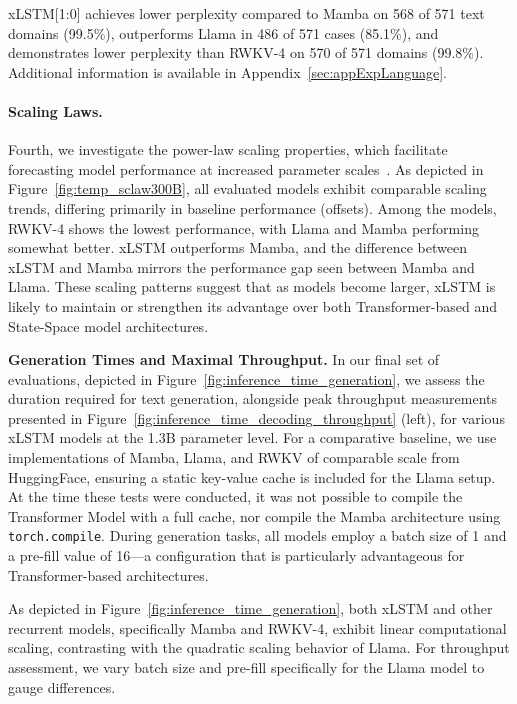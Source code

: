 xLSTM[1:0] achieves lower perplexity compared to Mamba on 568 of 571 text domains (99.5\%), outperforms Llama in 486 of 571 cases (85.1\%), and demonstrates lower perplexity than RWKV-4 on 570 of 571 domains (99.8\%). Additional information is available in Appendix~\ref{sec:appExpLanguage}.

\paragraph{Scaling Laws.} Fourth, we investigate the power-law scaling properties, which facilitate forecasting model performance at increased parameter scales~\citep{Kaplan:20,Brown:20short}. 
As depicted in Figure~\ref{fig:temp_sclaw300B}, all evaluated models exhibit comparable scaling trends, differing primarily in baseline performance (offsets). Among the models, RWKV-4 shows the lowest performance, with Llama and Mamba performing somewhat better. xLSTM outperforms Mamba, and the difference between xLSTM and Mamba mirrors the performance gap seen between Mamba and Llama. These scaling patterns suggest that as models become larger, xLSTM is likely to maintain or strengthen its advantage over both Transformer-based and State-Space model architectures.

\textbf{Generation Times and Maximal Throughput.} In our final set of evaluations, depicted in Figure~\ref{fig:inference_time_generation}, we assess the duration required for text generation, alongside peak throughput measurements presented in Figure~\ref{fig:inference_time_decoding_throughput} (left), for various xLSTM models at the 1.3B parameter level. For a comparative baseline, we use implementations of Mamba, Llama, and RWKV of comparable scale from HuggingFace, ensuring a static key-value cache is included for the Llama setup. At the time these tests were conducted, it was not possible to compile the Transformer Model with a full cache, nor compile the Mamba architecture using \texttt{torch.compile}. During generation tasks, all models employ a batch size of 1 and a pre-fill value of 16—a configuration that is particularly advantageous for Transformer-based architectures.

As depicted in Figure~\ref{fig:inference_time_generation}, both xLSTM and other recurrent models, specifically Mamba and RWKV-4, exhibit linear computational scaling, contrasting with the quadratic scaling behavior of Llama. For throughput assessment, we vary batch size and pre-fill specifically for the Llama model to gauge differences.

